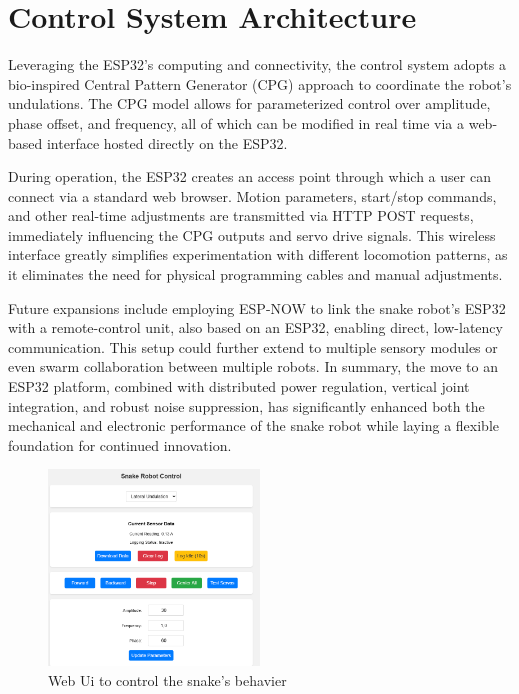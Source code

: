\documentclass[12pt,a4paper]{report}
\begin{document}
\section{Control System Architecture}
Leveraging the ESP32’s computing and connectivity, the control system adopts a bio-inspired Central Pattern Generator (CPG) approach to coordinate the robot’s undulations. The CPG model allows for parameterized control over amplitude, phase offset, and frequency, all of which can be modified in real time via a web-based interface hosted directly on the ESP32.

During operation, the ESP32 creates an access point through which a user can connect via a standard web browser. Motion parameters, start/stop commands, and other real-time adjustments are transmitted via HTTP POST requests, immediately influencing the CPG outputs and servo drive signals. This wireless interface greatly simplifies experimentation with different locomotion patterns, as it eliminates the need for physical programming cables and manual adjustments.

Future expansions include employing ESP-NOW to link the snake robot’s ESP32 with a remote-control unit, also based on an ESP32, enabling direct, low-latency communication. This setup could further extend to multiple sensory modules or even swarm collaboration between multiple robots. In summary, the move to an ESP32 platform, combined with distributed power regulation, vertical joint integration, and robust noise suppression, has significantly enhanced both the mechanical and electronic performance of the snake robot while laying a flexible foundation for continued innovation.

\begin{figure}[h]
\centering
\includegraphics[width=0.5\textwidth]{media/WebUi.png}
\caption{Web Ui to control the snake's behavier}
\end{figure}
\end{document}
